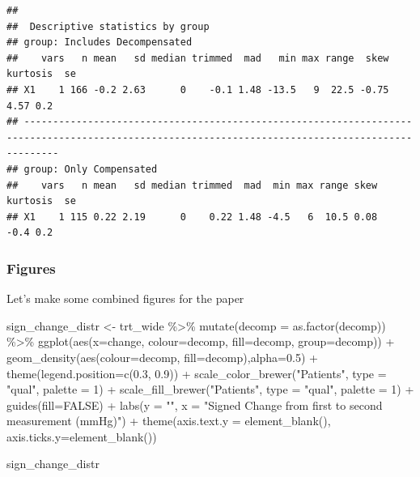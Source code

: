 \documentclass[
]{article}
\newenvironment{Shaded}{\begin{snugshade}}{\end{snugshade}}
\newcommand{\AttributeTok}[1]{\textcolor[rgb]{0.77,0.63,0.00}{#1}}
\newcommand{\ConstantTok}[1]{\textcolor[rgb]{0.00,0.00,0.00}{#1}}
\newcommand{\DecValTok}[1]{\textcolor[rgb]{0.00,0.00,0.81}{#1}}
\newcommand{\FloatTok}[1]{\textcolor[rgb]{0.00,0.00,0.81}{#1}}
\newcommand{\FunctionTok}[1]{\textcolor[rgb]{0.00,0.00,0.00}{#1}}
\newcommand{\NormalTok}[1]{#1}
\newcommand{\OtherTok}[1]{\textcolor[rgb]{0.56,0.35,0.01}{#1}}
\newcommand{\SpecialCharTok}[1]{\textcolor[rgb]{0.00,0.00,0.00}{#1}}
\newcommand{\StringTok}[1]{\textcolor[rgb]{0.31,0.60,0.02}{#1}}
\begin{document}
\begin{verbatim}
## 
##  Descriptive statistics by group 
## group: Includes Decompensated
##    vars   n mean   sd median trimmed  mad   min max range  skew kurtosis  se
## X1    1 166 -0.2 2.63      0    -0.1 1.48 -13.5   9  22.5 -0.75     4.57 0.2
## -------------------------------------------------------------------------------------------------------------------------------------------------- 
## group: Only Compensated
##    vars   n mean   sd median trimmed  mad  min max range skew kurtosis  se
## X1    1 115 0.22 2.19      0    0.22 1.48 -4.5   6  10.5 0.08     -0.4 0.2
\end{verbatim}

\hypertarget{figures}{%
\subsubsection{Figures}\label{figures}}

Let's make some combined figures for the paper

\begin{Shaded}
\begin{Highlighting}[]
\NormalTok{sign\_change\_distr }\OtherTok{\textless{}{-}}\NormalTok{ trt\_wide }\SpecialCharTok{\%\textgreater{}\%} 
  \FunctionTok{mutate}\NormalTok{(}\AttributeTok{decomp =} \FunctionTok{as.factor}\NormalTok{(decomp)) }\SpecialCharTok{\%\textgreater{}\%} 
  \FunctionTok{ggplot}\NormalTok{(}\FunctionTok{aes}\NormalTok{(}\AttributeTok{x=}\NormalTok{change, }\AttributeTok{colour=}\NormalTok{decomp, }\AttributeTok{fill=}\NormalTok{decomp, }\AttributeTok{group=}\NormalTok{decomp)) }\SpecialCharTok{+}
  \FunctionTok{geom\_density}\NormalTok{(}\FunctionTok{aes}\NormalTok{(}\AttributeTok{colour=}\NormalTok{decomp, }\AttributeTok{fill=}\NormalTok{decomp),}\AttributeTok{alpha=}\FloatTok{0.5}\NormalTok{) }\SpecialCharTok{+}
  \FunctionTok{theme}\NormalTok{(}\AttributeTok{legend.position=}\FunctionTok{c}\NormalTok{(}\FloatTok{0.3}\NormalTok{, }\FloatTok{0.9}\NormalTok{)) }\SpecialCharTok{+}
  \FunctionTok{scale\_color\_brewer}\NormalTok{(}\StringTok{"Patients"}\NormalTok{, }\AttributeTok{type =} \StringTok{"qual"}\NormalTok{, }\AttributeTok{palette =} \DecValTok{1}\NormalTok{) }\SpecialCharTok{+}
  \FunctionTok{scale\_fill\_brewer}\NormalTok{(}\StringTok{"Patients"}\NormalTok{, }\AttributeTok{type =} \StringTok{"qual"}\NormalTok{, }\AttributeTok{palette =} \DecValTok{1}\NormalTok{) }\SpecialCharTok{+}
  \FunctionTok{guides}\NormalTok{(}\AttributeTok{fill=}\ConstantTok{FALSE}\NormalTok{) }\SpecialCharTok{+}
  \FunctionTok{labs}\NormalTok{(}\AttributeTok{y =} \StringTok{""}\NormalTok{,}
       \AttributeTok{x =} \StringTok{"Signed Change from first to second measurement (mmHg)"}\NormalTok{) }\SpecialCharTok{+}
  \FunctionTok{theme}\NormalTok{(}\AttributeTok{axis.text.y =} \FunctionTok{element\_blank}\NormalTok{(),}
        \AttributeTok{axis.ticks.y=}\FunctionTok{element\_blank}\NormalTok{())}

\NormalTok{sign\_change\_distr}
\end{Highlighting}
\end{Shaded}
\end{document}
